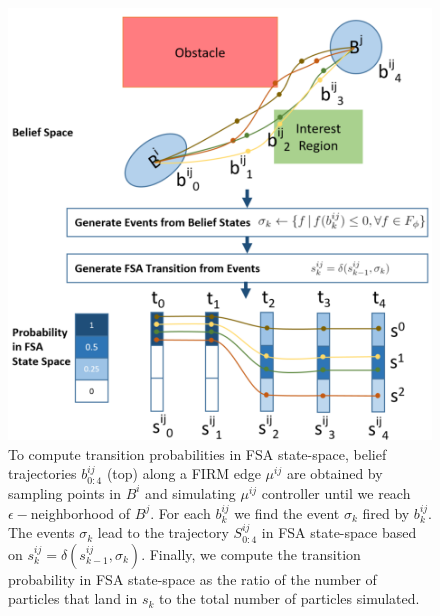 \documentclass[conference]{IEEEtran}
\begin{document}
\begin{figure}[h!]
	\centering
	\includegraphics[width=.8\columnwidth]{figs/BeliefRabinTransitionV3.png}
	\caption{To compute transition probabilities in FSA state-space, belief trajectories $b^{ij}_{0:4}$ (top) along a FIRM edge $\mu^{ij}$ are obtained by sampling points in $B^i$ and simulating $\mu^{ij}$ controller until we reach $\epsilon-$neighborhood of $B^j$. For each $b^{ij}_k$ we find the event $\sigma_k$ fired by $b^{ij}_k$. The events $\sigma_k$ lead to the trajectory $S^{ij}_{0:4}$ in FSA state-space based on $s^{ij}_k = \delta(s^{ij}_{k-1},\sigma_k)$. Finally, we compute the transition probability in FSA state-space as the ratio of the number of particles that land in $s_k$ to the total number of particles simulated.}
	\label{fig:TransProb}
\end{figure}

\end{document}
